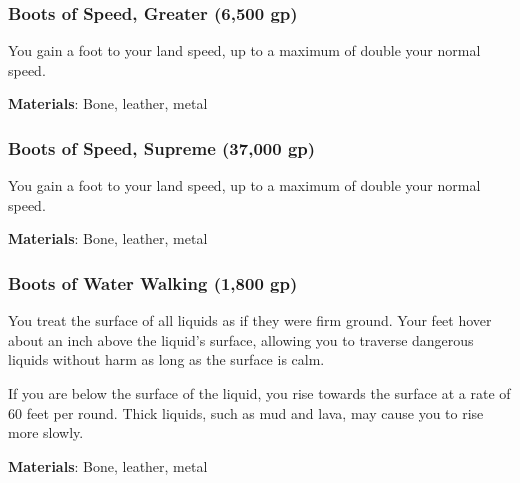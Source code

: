 \lowercase{\hypertarget{item:Boots of Speed, Greater}{}}\label{item:Boots of Speed, Greater}
\hypertarget{item:Boots of Speed, Greater}{\subsubsection{Boots of Speed, Greater\hfill{} (6,500 gp)}}

You gain a  foot  to your land speed, up to a maximum of double your normal speed.



\vspace{0.25em}
\textbf{Materials}: Bone, leather, metal


\lowercase{\hypertarget{item:Boots of Speed, Supreme}{}}\label{item:Boots of Speed, Supreme}
\hypertarget{item:Boots of Speed, Supreme}{\subsubsection{Boots of Speed, Supreme\hfill{} (37,000 gp)}}

You gain a  foot  to your land speed, up to a maximum of double your normal speed.



\vspace{0.25em}
\textbf{Materials}: Bone, leather, metal


\lowercase{\hypertarget{item:Boots of Water Walking}{}}\label{item:Boots of Water Walking}
\hypertarget{item:Boots of Water Walking}{\subsubsection{Boots of Water Walking\hfill{} (1,800 gp)}}

You treat the surface of all liquids as if they were firm ground.
Your feet hover about an inch above the liquid's surface, allowing you to traverse dangerous liquids without harm as long as the surface is calm.

If you are below the surface of the liquid, you rise towards the surface at a rate of 60 feet per round.
Thick liquids, such as mud and lava, may cause you to rise more slowly.



\vspace{0.25em}
\textbf{Materials}: Bone, leather, metal


